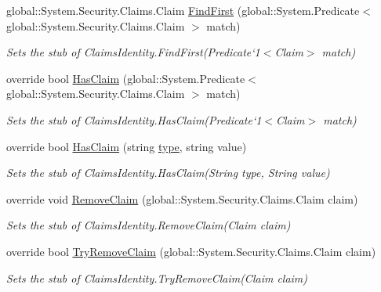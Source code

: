 \begin{DoxyCompactItemize}
global\-::\-System.\-Security.\-Claims.\-Claim \hyperlink{class_system_1_1_security_1_1_principal_1_1_fakes_1_1_stub_windows_identity_a1c9bf413e10b23b2fb6b262a73d03d16}{Find\-First} (global\-::\-System.\-Predicate$<$ global\-::\-System.\-Security.\-Claims.\-Claim $>$ match)
\begin{DoxyCompactList}\small\item\em Sets the stub of Claims\-Identity.\-Find\-First(Predicate`1$<$Claim$>$ match)\end{DoxyCompactList}\item 
override bool \hyperlink{class_system_1_1_security_1_1_principal_1_1_fakes_1_1_stub_windows_identity_aa94d9c4ce5520ef21ddc8fa58a5aed6e}{Has\-Claim} (global\-::\-System.\-Predicate$<$ global\-::\-System.\-Security.\-Claims.\-Claim $>$ match)
\begin{DoxyCompactList}\small\item\em Sets the stub of Claims\-Identity.\-Has\-Claim(Predicate`1$<$Claim$>$ match)\end{DoxyCompactList}\item 
override bool \hyperlink{class_system_1_1_security_1_1_principal_1_1_fakes_1_1_stub_windows_identity_a8bc772c141da03e3a761512542397289}{Has\-Claim} (string \hyperlink{jquery-1_810_82-vsdoc_8js_a3940565e83a9bfd10d95ffd27536da91}{type}, string value)
\begin{DoxyCompactList}\small\item\em Sets the stub of Claims\-Identity.\-Has\-Claim(\-String type, String value)\end{DoxyCompactList}\item 
override void \hyperlink{class_system_1_1_security_1_1_principal_1_1_fakes_1_1_stub_windows_identity_a7788659bbe71dce764398d7005492e1a}{Remove\-Claim} (global\-::\-System.\-Security.\-Claims.\-Claim claim)
\begin{DoxyCompactList}\small\item\em Sets the stub of Claims\-Identity.\-Remove\-Claim(\-Claim claim)\end{DoxyCompactList}\item 
override bool \hyperlink{class_system_1_1_security_1_1_principal_1_1_fakes_1_1_stub_windows_identity_ade2d8553b3e8623b3d4f72a2565de86e}{Try\-Remove\-Claim} (global\-::\-System.\-Security.\-Claims.\-Claim claim)
\begin{DoxyCompactList}\small\item\em Sets the stub of Claims\-Identity.\-Try\-Remove\-Claim(\-Claim claim)\end{DoxyCompactList}\end{DoxyCompactItemize}
